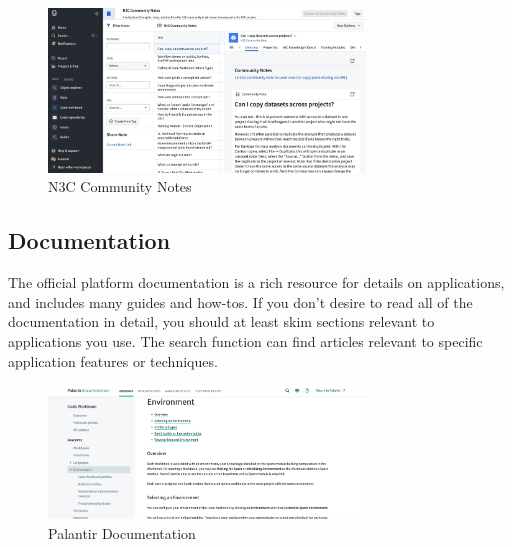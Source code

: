 \documentclass[
  letterpaper,
  DIV=11,
  numbers=noendperiod]{scrreprt}
\begin{document}
\begin{figure}

{\centering \includegraphics[width=0.75\textwidth,height=\textheight]{chapters/images/support/image-16-community-notes.png}

}

\caption{\label{fig-support-community-notes}N3C Community Notes}

\end{figure}

\hypertarget{sec-support-training-documentation}{%
\subsection{Documentation}\label{sec-support-training-documentation}}

The official platform documentation is a rich resource for details on
applications, and includes many guides and how-tos. If you don't desire
to read all of the documentation in detail, you should at least skim
sections relevant to applications you use. The search function can find
articles relevant to specific application features or techniques.

\begin{figure}

{\centering \includegraphics[width=0.75\textwidth,height=\textheight]{chapters/images/support/image-17-palantir-documentation.png}

}

\caption{\label{fig-support-palantir-documentation}Palantir
Documentation}

\end{figure}
\end{document}
